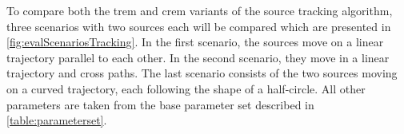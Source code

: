 To compare both the \gls{trem} and \gls{crem} variants of the source tracking algorithm, three scenarios with two sources each will be compared which are presented in \autoref{fig:evalScenariosTracking}. In the first scenario, the sources move on a linear trajectory parallel to each other. In the second scenario, they move in a linear trajectory and cross paths. The last scenario consists of the two sources moving on a curved trajectory, each following the shape of a half-circle. All other parameters are taken from the base parameter set described in \autoref{table:parameterset}.


